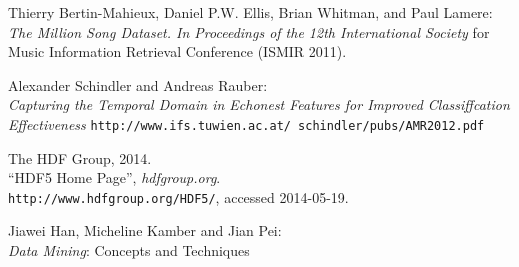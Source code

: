 
\begin{thebibliography}{10}


Thierry Bertin-Mahieux, Daniel P.W. Ellis, Brian Whitman, and Paul Lamere:\\
\emph{The Million Song Dataset. In Proceedings of the 12th International Society}
for Music Information Retrieval Conference (ISMIR 2011).

Alexander Schindler and Andreas Rauber: \\
\emph{Capturing the Temporal Domain in Echonest Features for Improved Classiffcation Effectiveness}
\texttt{http://www.ifs.tuwien.ac.at/~schindler/pubs/AMR2012.pdf}

The HDF Group,
2014.\\
``HDF5 Home Page'',
\emph{hdfgroup.org}.\\
\verb+http://www.hdfgroup.org/HDF5/+, accessed 2014-05-19.

Jiawei Han, Micheline Kamber and Jian Pei:\\
\emph{Data Mining}: Concepts and Techniques


\end{thebibliography}